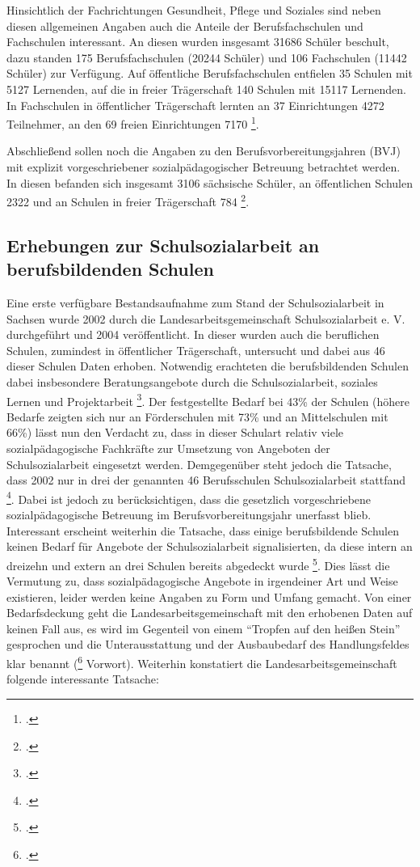 Hinsichtlich der Fachrichtungen Gesundheit, Pflege und Soziales sind neben diesen allgemeinen Angaben auch die Anteile der Berufsfachschulen und Fachschulen interessant. An diesen wurden insgesamt 31686 Schüler beschult, dazu standen 175 Berufsfachschulen (20244 Schüler) und 106 Fachschulen (11442 Schüler) zur Verfügung. Auf öffentliche Berufsfachschulen entfielen 35 Schulen mit 5127 Lernenden, auf die in freier Trägerschaft 140 Schulen mit 15117 Lernenden. In Fachschulen in öffentlicher Trägerschaft lernten an 37 Einrichtungen 4272 Teilnehmer, an den 69 freien Einrichtungen 7170 \footcite[vgl.][286ff]{SLFS2015}. 

Abschließend sollen noch die Angaben zu den Berufsvorbereitungsjahren (BVJ) mit explizit vorgeschriebener sozialpädagogischer Betreuung betrachtet werden. In diesen befanden sich insgesamt 3106 sächsische Schüler, an öffentlichen Schulen 2322 und an Schulen in freier Trägerschaft 784 \footcite[vgl.][286ff]{SLFS2015}. 

\subsection{Erhebungen zur Schulsozialarbeit an berufsbildenden Schulen}
\label{sec:ErhebungenZurSchulsozialarbeitAnBerufsbildendenSchulen}

Eine erste verfügbare Bestandsaufnahme zum Stand der Schulsozialarbeit in Sachsen wurde 2002 durch die Landesarbeitsgemeinschaft Schulsozialarbeit e. V. durchgeführt und 2004 veröffentlicht. In dieser wurden auch die beruflichen Schulen, zumindest in öffentlicher Trägerschaft, untersucht und dabei aus 46 dieser Schulen Daten erhoben. Notwendig erachteten die berufsbildenden Schulen dabei insbesondere Beratungsangebote durch die Schulsozialarbeit, soziales Lernen und Projektarbeit \footcite[vgl.][6ff]{LSS2004}. Der festgestellte Bedarf bei 43\% der Schulen (höhere Bedarfe zeigten sich nur an Förderschulen mit 73\% und an Mittelschulen mit 66\%) lässt nun den Verdacht zu, dass in dieser Schulart relativ viele sozialpädagogische Fachkräfte zur Umsetzung von Angeboten der Schulsozialarbeit eingesetzt werden. Demgegenüber steht jedoch die Tatsache, dass 2002 nur in drei der genannten 46 Berufsschulen Schulsozialarbeit stattfand \footcite[vgl.][6ff]{LSS2004}. Dabei ist jedoch zu berücksichtigen, dass die gesetzlich vorgeschriebene sozialpädagogische Betreuung im Berufsvorbereitungsjahr unerfasst blieb. Interessant erscheint weiterhin die Tatsache, dass einige berufsbildende Schulen keinen Bedarf für Angebote der Schulsozialarbeit signalisierten, da diese intern an dreizehn und extern an drei Schulen bereits abgedeckt wurde \footcite[vgl.][5]{LSS2004}. Dies lässt die Vermutung zu, dass sozialpädagogische Angebote in irgendeiner Art und Weise existieren, leider werden keine Angaben zu Form und Umfang gemacht. Von einer Bedarfsdeckung geht die Landesarbeitsgemeinschaft mit den erhobenen Daten auf keinen Fall aus, es wird im Gegenteil von einem "`Tropfen auf den heißen Stein"' gesprochen und die Unterausstattung und der Ausbaubedarf des Handlungsfeldes klar benannt (\footcite[vgl.]{LSS2004} Vorwort). Weiterhin konstatiert die Landesarbeitsgemeinschaft folgende interessante Tatsache: 

